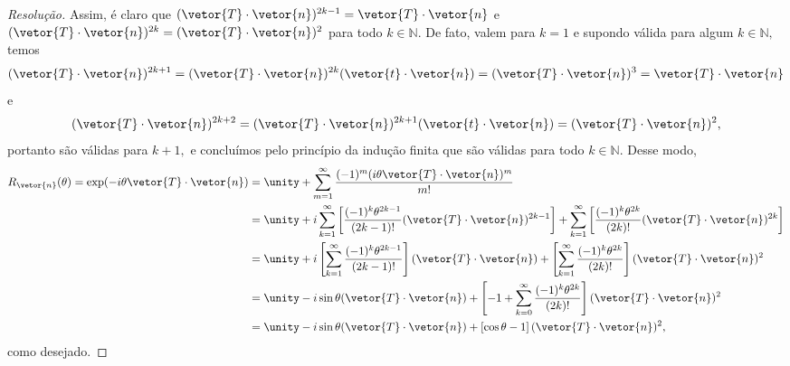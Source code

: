 \begin{proof}[Resolução]
   Assim, é claro que \((\vetor{T} \cdot \vetor{n})^{2k - 1} = \vetor{T} \cdot \vetor{n}\) e \((\vetor{T} \cdot \vetor{n})^{2k} = (\vetor{T} \cdot \vetor{n})^2\) para todo \(k \in \mathbb{N}.\) De fato, valem para \(k = 1\) e supondo válida para algum \(k \in \mathbb{N},\) temos 
   \begin{equation*}
      (\vetor{T} \cdot \vetor{n})^{2k + 1} = (\vetor{T} \cdot \vetor{n})^{2k} (\vetor{t} \cdot \vetor{n}) = (\vetor{T} \cdot \vetor{n})^3 = \vetor{T} \cdot \vetor{n}
   \end{equation*}
   e
   \begin{equation*}
      (\vetor{T} \cdot \vetor{n})^{2k + 2} = (\vetor{T} \cdot \vetor{n})^{2k+1} (\vetor{t} \cdot \vetor{n}) = (\vetor{T} \cdot \vetor{n})^2,
   \end{equation*}
   portanto são válidas para \(k + 1,\) e concluímos pelo princípio da indução finita que são válidas para todo \(k \in \mathbb{N}.\) Desse modo,
   \begin{align*}
      R_{\vetor{n}}(\theta) = \exp( - i\theta \vetor{T} \cdot \vetor{n}) 
      &= \unity + \sum_{m = 1}^\infty \frac{(-1)^m (i \theta \vetor{T} \cdot \vetor{n})^m}{m!}\\
      &= \unity + i\sum_{k = 1}^\infty\left[\frac{(-1)^k \theta^{2k - 1}}{(2k - 1)!} (\vetor{T} \cdot \vetor{n})^{2k - 1}\right] + \sum_{k = 1}^\infty\left[\frac{(-1)^k \theta^{2k}}{(2k)!} (\vetor{T} \cdot \vetor{n})^{2k}\right]\\
      &= \unity + i\left[\sum_{k = 1}^\infty\frac{(-1)^k \theta^{2k - 1}}{(2k - 1)!} \right](\vetor{T} \cdot \vetor{n}) + \left[\sum_{k = 1}^\infty\frac{(-1)^k \theta^{2k}}{(2k)!} \right](\vetor{T} \cdot \vetor{n})^{2}\\
      &= \unity - i \sin\theta (\vetor{T} \cdot \vetor{n}) + \left[-1 + \sum_{k = 0}^\infty \frac{(-1)^k\theta^{2k}}{(2k)!}\right] (\vetor{T} \cdot \vetor{n})^2\\
      &= \unity - i\sin\theta(\vetor{T} \cdot \vetor{n}) + \left[\cos\theta - 1\right] (\vetor{T}\cdot\vetor{n})^2,
   \end{align*}
   como desejado.
\end{proof}
